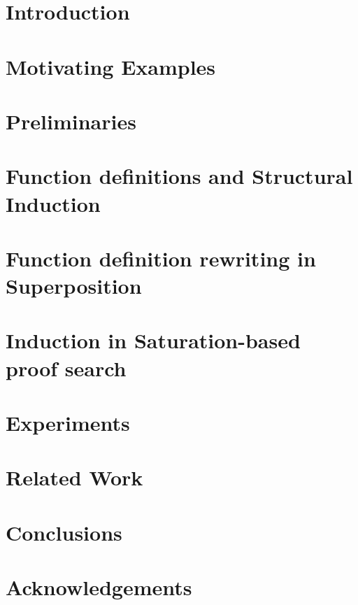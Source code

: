 \documentclass[runningheads]{llncs}
\begin{document}
\section{Introduction}


\section{Motivating Examples}
\label{sec:motivating}


\section{Preliminaries}


\section{Function definitions and Structural Induction}
\label{sec:fn_defs}


\section{Function definition rewriting in Superposition}
\label{sec:fn_def_rewriting}


\section{Induction in Saturation-based proof search}

\section{Experiments}
\label{sec:experiments}


\section{Related Work}


\section{Conclusions}

\section*{Acknowledgements}

%
%
%
% 
% 
%



 
\end{document}
